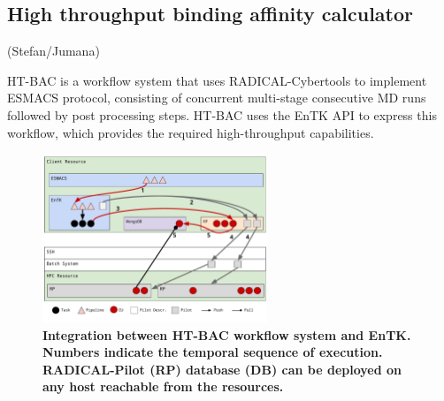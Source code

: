 \subsection{High throughput binding affinity calculator}

(Stefan/Jumana)

HT-BAC is a workflow system that uses RADICAL-Cybertools to implement ESMACS protocol, consisting of concurrent multi-stage consecutive MD runs followed by post processing steps. HT-BAC uses the EnTK API to express this workflow, which provides the required high-throughput capabilities. 

\begin{figure}[tb]
\centering
  \includegraphics[width=0.6\textwidth]{FIGURES/ht-bac-rp_integration.pdf}
  \caption{\bf Integration between HT-BAC workflow system and EnTK. Numbers indicate the temporal sequence of execution. RADICAL-Pilot (RP) database (DB) can be deployed on any host reachable from the resources.}
   \label{figure:ht-bac_rp}
\end{figure}
